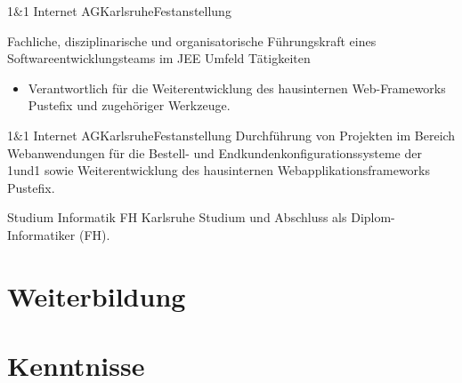 \documentclass[11pt, a4paper, sans]{moderncv}
\begin{document}
 {1\&1 Internet AG}{Karlsruhe}{Festanstellung}{
Fachliche, disziplinarische und organisatorische Führungskraft eines Softwareentwicklungsteams im JEE Umfeld
\newline{}\newline{}
Tätigkeiten
\begin{itemize}
\item Verantwortlich für die Weiterentwicklung des hausinternen Web-Frameworks Pustefix und zugehöriger Werkzeuge.
\end{itemize}}

 {1\&1 Internet AG}{Karlsruhe}{Festanstellung} {
Durchführung von Projekten im Bereich Webanwendungen für die Bestell- und Endkundenkonfigurationssysteme der 1und1 sowie Weiterentwicklung des hausinternen Webapplikationsframeworks Pustefix.
}

 {Studium Informatik} {FH Karlsruhe} {}{} {
Studium und Abschluss als Diplom-Informatiker (FH).
} 

\section{Weiterbildung}
 {}
 {}

\section{Kenntnisse}

\end{document}
